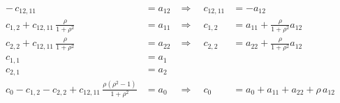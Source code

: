 \begin{align*}
-\,c_{12, 11} &= a_{12} &\Rightarrow\quad c_{12, 11} &= -a_{12} \\[0.5em]
c_{1,2} + c_{12, 11}\,\tfrac{\rho}{1+\rho^2} &= a_{11} 
&\Rightarrow\quad c_{1,2} &= a_{11} + \tfrac{\rho}{1+\rho^2}a_{12} \\[0.5em]
c_{2,2} + c_{12, 11}\,\tfrac{\rho}{1+\rho^2} &= a_{22} 
&\Rightarrow\quad c_{2,2} &= a_{22} + \tfrac{\rho}{1+\rho^2}a_{12} \\[0.5em]
c_{1,1} &= a_1 \\[0.5em]
c_{2,1} &= a_2 \\[0.5em]
c_0 - c_{1,2} - c_{2,2} + c_{12, 11}\,\tfrac{\rho(\rho^2 - 1)}{1+\rho^2} &= a_0 
&\Rightarrow\quad 
c_0 &= a_0 + a_{11} + a_{22} + \rho\,a_{12}
\end{align*}

